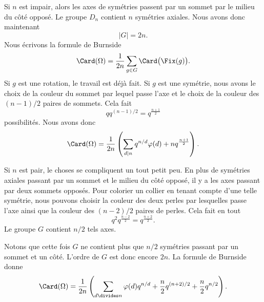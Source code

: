 Si \( n\) est impair, alors les axes de symétries passent par un sommet par le milieu du côté opposé. Le groupe \( D_n\) contient \( n\) symétries axiales. Nous avons donc maintenant
\begin{equation}
    | G |=2n.
\end{equation}
Nous écrivons la formule de Burnside
\begin{equation}
    \Card(\Omega)=\frac{1}{ 2n }\sum_{g\in G}\Card\big( \Fix(g) \big).
\end{equation}
Si \( g\) est une rotation, le travail est déjà fait. Si \( g\) est une symétrie, nous avons le choix de la couleur du sommet par lequel passe l'axe et le choix de la couleur des \( (n-1)/2\) paires de sommets. Cela fait
\begin{equation}
    qq^{(n-1)/2}=q^{\frac{ n+1 }{2}}
\end{equation}
possibilités. Nous avons donc
\begin{equation}
    \Card(\Omega)=\frac{1}{ 2n }\left( \sum_{d|n}q^{n/d}\varphi(d)+nq^{\frac{ n+1 }{2}} \right).
\end{equation}

Si \( n\) est pair, le choses se compliquent un tout petit peu. En plus de symétries axiales passant par un sommet et le milieu du côté opposé, il y a les axes passant par deux sommets opposés. Pour colorier un collier en tenant compte d'une telle symétrie, nous pouvons choisir la couleur des deux perles par lesquelles passe l'axe ainsi que la couleur des \( (n-2)/2\) paires de perles. Cela fait en tout
\begin{equation}
    q^2q^{\frac{ n-2 }{2}}=q^{\frac{ n+2 }{2}}.
\end{equation}
Le groupe \( G\) contient \( n/2\) tels axes.

Notons que cette fois \( G\) ne contient plus que \( n/2\) symétries passant par un sommet et un côté. L'ordre de $G$ est donc encore \( 2n\). La formule de Burnside donne
\begin{equation}
    \Card(\Omega)=\frac{1}{ 2n }\left( \sum_{d\divides n}\varphi(d)q^{n/d}+\frac{ n }{2}q^{(n+2)/2}+\frac{ n }{2}q^{n/2} \right).
\end{equation}
